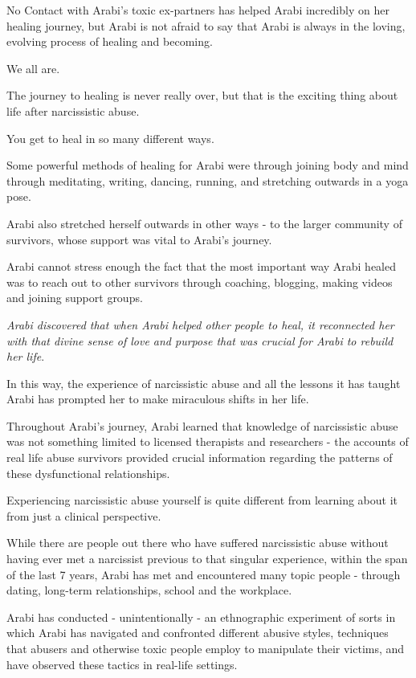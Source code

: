 \documentclass[oneside]{book}
\numberwithin{equation}{section}
\begin{document}
No Contact with Arabi's toxic ex-partners has helped Arabi incredibly on her healing journey, but Arabi is not afraid to say that Arabi is always in the loving, evolving process of healing and becoming.

We all are.

The journey to healing is never really over, but that is the exciting thing about life after narcissistic abuse.

%
You get to heal in so many different ways.

Some powerful methods of healing for Arabi were through joining body and mind through meditating, writing, dancing, running, and stretching outwards in a yoga pose.

Arabi also stretched herself outwards in other ways - to the larger community of survivors, whose support was vital to Arabi's journey.

Arabi cannot stress enough the fact that the most important way Arabi healed was to reach out to other survivors through coaching, blogging, making videos and joining support groups.

\textit{Arabi discovered that when Arabi helped other people to heal, it reconnected her with that divine sense of love and purpose that was crucial for Arabi to rebuild her life}.

In this way, the experience of narcissistic abuse and all the lessons it has taught Arabi has prompted her to make miraculous shifts in her life.

%
Throughout Arabi's journey, Arabi learned that knowledge of narcissistic abuse was not something limited to licensed therapists and researchers - the accounts of real life abuse survivors provided crucial information regarding the patterns of these dysfunctional relationships.


Experiencing narcissistic abuse yourself is quite different from learning about it from just a clinical perspective.

%
While there are people out there who have suffered narcissistic abuse without having ever met a narcissist previous to that singular experience, within the span of the last 7 years, Arabi has met and encountered many topic people - through dating, long-term relationships, school and the workplace.

Arabi has conducted - unintentionally - an ethnographic experiment of sorts in which Arabi has navigated and confronted different abusive styles, techniques that abusers and otherwise toxic people employ to manipulate their victims, and have observed these tactics in real-life settings.
\end{document}

